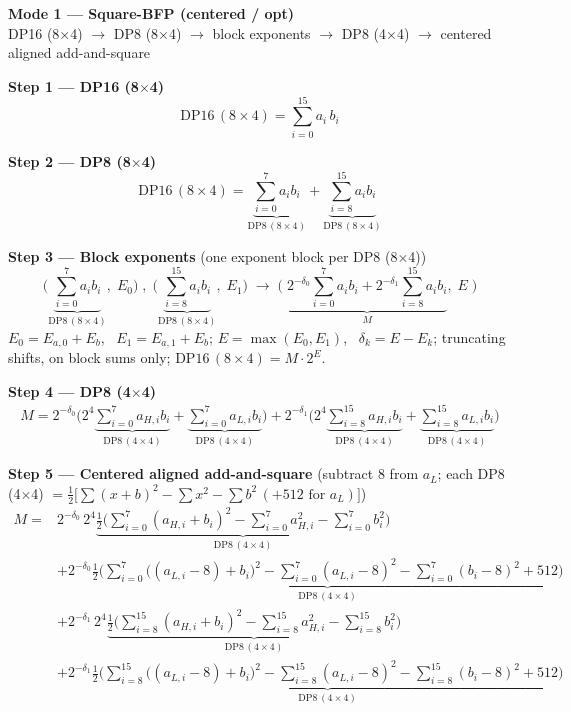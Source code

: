 \documentclass[fleqn]{article}
\newcommand{\DPop}[3]{\mathrm{DP#1}\,(#2\!\times\!#3)}
\begin{document}
\begin{center}
{\LARGE \textbf{Mode 1 --- Square-BFP (centered / opt)}}\\[4pt]
{\large DP16 (8$\times$4) $\rightarrow$ DP8 (8$\times$4) $\rightarrow$ block exponents $\rightarrow$ DP8 (4$\times$4) $\rightarrow$ centered aligned add-and-square}
\end{center}

\vspace{0.2em}

\textbf{Step 1 --- DP16 (8$\times$4)}
\[ \DPop{16}{8}{4} = \sum_{i=0}^{15} a_i \, b_i \]

\textbf{Step 2 --- DP8 (8$\times$4)}
\[
\DPop{16}{8}{4} = \underbrace{\sum_{i=0}^{7} a_i b_i}_{\DPop{8}{8}{4}} + \underbrace{\sum_{i=8}^{15} a_i b_i}_{\DPop{8}{8}{4}}
\]

\textbf{Step 3 --- Block exponents}\quad
{\small(one exponent block per DP8 (8$\times$4))}
\[
\Big(\underbrace{\sum_{i=0}^{7} a_i b_i}_{\DPop{8}{8}{4}},\; E_0\Big) \;,\;
\Big(\underbrace{\sum_{i=8}^{15} a_i b_i}_{\DPop{8}{8}{4}},\; E_1\Big)
\;\longrightarrow\;
\Big(\; \underbrace{2^{-\delta_0}\sum_{i=0}^{7} a_i b_i + 2^{-\delta_1}\sum_{i=8}^{15} a_i b_i}_{M},\; E \;\Big)
\]
$E_0=E_{a,0}+E_b$, \ $E_1=E_{a,1}+E_b$; \quad $E=\max(E_0,E_1)$, \ $\delta_k=E-E_k$; \quad truncating shifts, on block sums only; \quad $\DPop{16}{8}{4}=M\cdot2^{E}$.

\textbf{Step 4 --- DP8 (4$\times$4)}
\begin{align*}
M =
  2^{-\delta_0}\Big( 2^{4}\underbrace{\sum_{i=0}^{7} a_{H,i} b_i}_{\DPop{8}{4}{4}}
   + \underbrace{\sum_{i=0}^{7} a_{L,i} b_i}_{\DPop{8}{4}{4}} \Big)
 + 2^{-\delta_1}\Big( 2^{4}\underbrace{\sum_{i=8}^{15} a_{H,i} b_i}_{\DPop{8}{4}{4}}
   + \underbrace{\sum_{i=8}^{15} a_{L,i} b_i}_{\DPop{8}{4}{4}} \Big)
\end{align*}

\textbf{Step 5 --- Centered aligned add-and-square}\quad
{\small(subtract $8$ from $a_L$; each DP8 (4$\times$4) $=\tfrac12\big[\sum(x{+}b)^2-\sum x^2-\sum b^2\,(+512\text{ for }a_L)\big]$)}
\begin{align*}
M = {}
  & 2^{-\delta_0}\,2^{4}\underbrace{\tfrac12\Big(\sum_{i=0}^{7}(a_{H,i}{+}b_i)^2 - \sum_{i=0}^{7}a_{H,i}^2 - \sum_{i=0}^{7}b_i^2\Big)}_{\DPop{8}{4}{4}} \\[0.15em]
  & + 2^{-\delta_0}\underbrace{\tfrac12\Big(\sum_{i=0}^{7}\big((a_{L,i}{-}8){+}b_i\big)^2 - \sum_{i=0}^{7}(a_{L,i}{-}8)^2 - \sum_{i=0}^{7}(b_i{-}8)^2 + 512\Big)}_{\DPop{8}{4}{4}} \\[0.15em]
  & + 2^{-\delta_1}\,2^{4}\underbrace{\tfrac12\Big(\sum_{i=8}^{15}(a_{H,i}{+}b_i)^2 - \sum_{i=8}^{15}a_{H,i}^2 - \sum_{i=8}^{15}b_i^2\Big)}_{\DPop{8}{4}{4}} \\[0.15em]
  & + 2^{-\delta_1}\underbrace{\tfrac12\Big(\sum_{i=8}^{15}\big((a_{L,i}{-}8){+}b_i\big)^2 - \sum_{i=8}^{15}(a_{L,i}{-}8)^2 - \sum_{i=8}^{15}(b_i{-}8)^2 + 512\Big)}_{\DPop{8}{4}{4}}
\end{align*}
\end{document}
